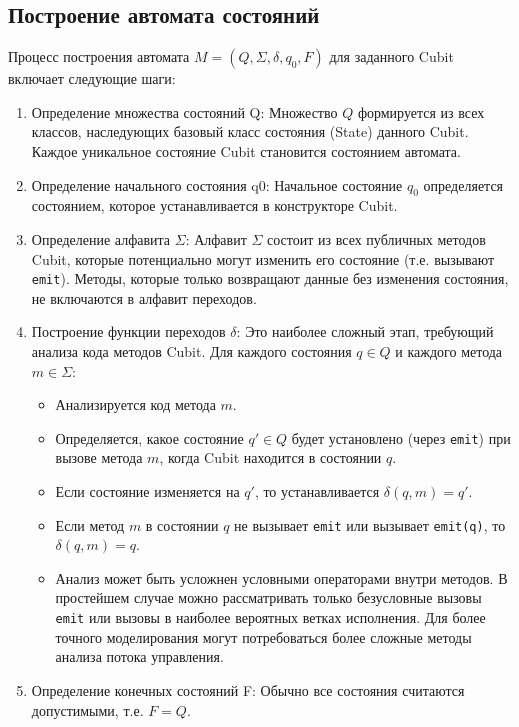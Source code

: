 \documentclass[14pt, russian]{scrartcl}
\begin{document}
\subsection{Построение автомата состояний}

Процесс построения автомата $M = (Q, \Sigma, \delta, q_0, F)$ для заданного Cubit включает следующие шаги:

\begin{enumerate}
    \item {Определение множества состояний Q:} Множество $Q$ формируется из всех классов, наследующих базовый класс состояния (State) данного Cubit. Каждое уникальное состояние Cubit становится состоянием автомата.
    \item {Определение начального состояния q0:} Начальное состояние $q_0$ определяется состоянием, которое устанавливается в конструкторе Cubit.
    \item {Определение алфавита $\Sigma$:} Алфавит $\Sigma$ состоит из всех публичных методов Cubit, которые потенциально могут изменить его состояние (т.е. вызывают \texttt{emit}). Методы, которые только возвращают данные без изменения состояния, не включаются в алфавит переходов.
    \item {Построение функции переходов $\delta$:} Это наиболее сложный этап, требующий анализа кода методов Cubit. Для каждого состояния $q \in Q$ и каждого метода $m \in \Sigma$:
        \begin{itemize}
            \item Анализируется код метода $m$.
            \item Определяется, какое состояние $q' \in Q$ будет установлено (через \texttt{emit}) при вызове метода $m$, когда Cubit находится в состоянии $q$.
            \item Если состояние изменяется на $q'$, то устанавливается $\delta(q, m) = q'$.
            \item Если метод $m$ в состоянии $q$ не вызывает \texttt{emit} или вызывает \texttt{emit(q)}, то $\delta(q, m) = q$.
            \item Анализ может быть усложнен условными операторами внутри методов. В простейшем случае можно рассматривать только безусловные вызовы \texttt{emit} или вызовы в наиболее вероятных ветках исполнения. Для более точного моделирования могут потребоваться более сложные методы анализа потока управления.
        \end{itemize}
    \item {Определение конечных состояний F:} Обычно все состояния считаются допустимыми, т.е. $F = Q$.
\end{enumerate}
\end{document}

